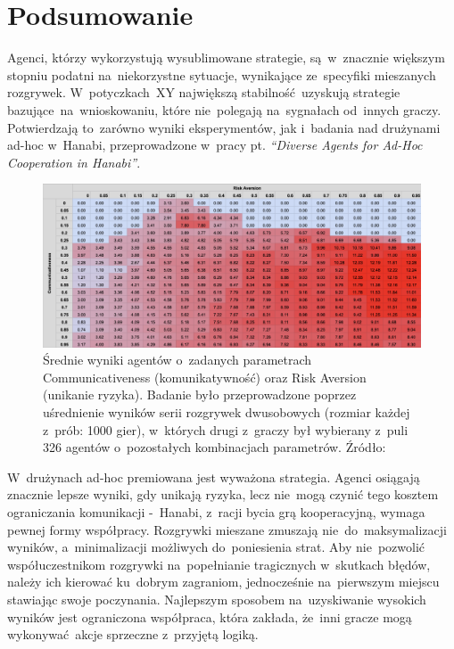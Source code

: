 \documentclass[declaration,shortabstract,inz]{iithesis}
\begin{document}
\section{Podsumowanie}

Agenci, którzy wykorzystują wysublimowane strategie, są~w~znacznie większym stopniu podatni na~niekorzystne sytuacje, wynikające ze~specyfiki mieszanych rozgrywek. W~potyczkach~XY największą stabilność uzyskują strategie bazujące na~wnioskowaniu, które nie~polegają na~sygnałach od~innych graczy. Potwierdzają to~zarówno wyniki eksperymentów, jak i~badania nad drużynami ad-hoc w~Hanabi, przeprowadzone w~pracy pt. \textit{``Diverse Agents for Ad-Hoc Cooperation in Hanabi''}\cite{AdHoc}.

\bigskip

\begin{figure}[H]
	\centering
	\captionsetup{format=hang}
	\includegraphics[width=\textwidth,height=\textheight,keepaspectratio]{ad-hoc.png}
	\caption[Caption]{Średnie wyniki agentów o~zadanych parametrach Communicativeness (komunikatywność) oraz Risk Aversion (unikanie ryzyka). Badanie było przeprowadzone poprzez uśrednienie wyników serii rozgrywek dwusobowych (rozmiar każdej z~prób: 1000 gier), w~których drugi z~graczy był wybierany z~puli 326 agentów o~pozostałych kombinacjach parametrów. Źródło: \cite{AdHoc}}
	\label{fig:ad-hoc}
\end{figure}

W~drużynach ad-hoc premiowana jest wyważona strategia. Agenci osiągają znacznie lepsze wyniki, gdy unikają ryzyka, lecz nie~mogą czynić tego kosztem ograniczania komunikacji -~Hanabi, z~racji bycia grą kooperacyjną, wymaga pewnej formy współpracy. Rozgrywki mieszane zmuszają nie~do~maksymalizacji wyników, a~minimalizacji możliwych do~poniesienia strat. Aby nie~pozwolić współuczestnikom rozgrywki na~popełnianie tragicznych w~skutkach błędów, należy ich kierować ku~dobrym zagraniom, jednocześnie na~pierwszym miejscu stawiając swoje poczynania. Najlepszym sposobem na~uzyskiwanie wysokich wyników jest ograniczona współpraca, która zakłada, że~inni gracze mogą wykonywać akcje sprzeczne z~przyjętą logiką.
\end{document}
